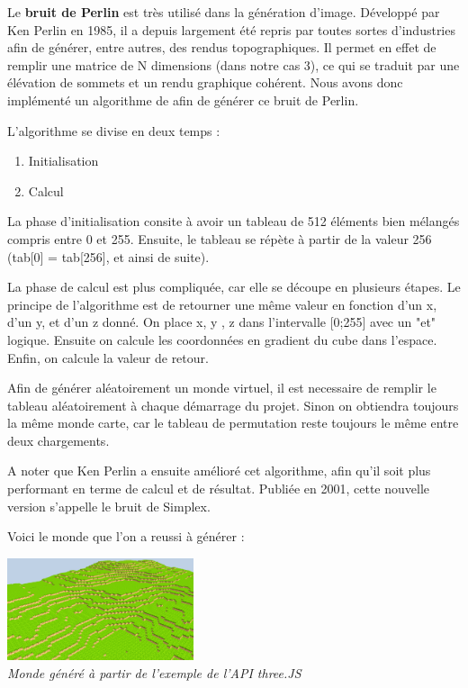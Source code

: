 ﻿Le \textbf{bruit de Perlin} est très utilisé dans la génération d'image. Développé par Ken Perlin en 1985, il a depuis largement été repris par toutes sortes d'industries afin de générer, entre autres, des rendus topographiques.	Il permet en effet de remplir une matrice de N dimensions (dans notre cas 3), ce qui se traduit par une élévation de sommets et un rendu graphique cohérent. Nous avons donc implémenté un algorithme de afin de générer ce bruit de Perlin. 

L'algorithme se divise en deux temps :

\begin{enumerate}
	\item Initialisation
	\item Calcul
\end{enumerate}

La phase d'initialisation consite à avoir un tableau de 512 éléments bien mélangés compris entre 0 et 255. Ensuite, le tableau se répète à partir de la valeur 256 (tab[0] = tab[256], et ainsi de suite). 

La phase de calcul est plus compliquée, car elle se découpe en plusieurs étapes. Le principe de l'algorithme est de retourner une même valeur en fonction d'un x, d'un y, et d'un z donné. On place x, y , z dans l'intervalle [0;255] avec un "et" logique. Ensuite on calcule les coordonnées en gradient du cube dans l'espace. Enfin, on calcule la valeur de retour. 

Afin de générer aléatoirement un monde virtuel, il est necessaire de remplir le tableau aléatoirement à chaque démarrage du projet. Sinon on obtiendra toujours la même monde carte, car le tableau de permutation reste toujours le même entre deux chargements.

A noter que Ken Perlin a ensuite amélioré cet algorithme, afin qu'il soit plus performant en terme de calcul et de résultat. Publiée en 2001, cette nouvelle version s'appelle le bruit de Simplex.

Voici le monde que l'on a reussi à générer :

\begin{center}
	\null\vspace{0.25cm}
	\includegraphics[height=3cm]{images/OurMinecraftWorld.png}\\
	\textit{Monde généré à partir de l'exemple de l'API three.JS}\\
\end{center}

